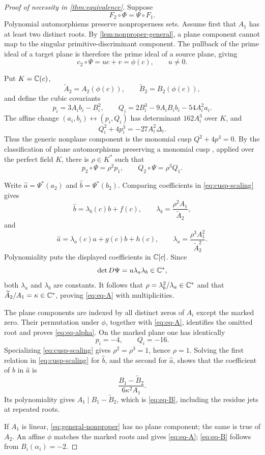 \documentclass[11pt,reqno]{amsart}
\begin{document}
\begin{proof}[Proof of necessity in \cref{thm:equivalence}]
Suppose
\[
F_2\circ\Phi=\Psi\circ F_1.
\]
Polynomial automorphisms preserve nonproperness sets.  Assume first that
\(A_1\) has at least two distinct roots.  By
\cref{lem:nonproper-general}, a plane component cannot map to the singular
primitive-discriminant component.  The pullback of the prime ideal of a
target plane is therefore the prime ideal of a source plane, giving
\begin{equation}
\label{eq:c-affine}
c_2\circ\Psi=uc+v=\phi(c),\qquad u\ne0.
\end{equation}

Put \(K=\mathbb C(c)\),
\[
\widetilde A_2=A_2(\phi(c)),\qquad
\widetilde B_2=B_2(\phi(c)),
\]
and define the cubic covariants
\[
p_i=3A_i b_i-B_i^2,\qquad
Q_i=2B_i^3-9A_iB_i b_i-54A_i^2a_i.
\]
The affine change \((a_i,b_i)\leftrightarrow(p_i,Q_i)\) has determinant
\(162A_i^3\) over \(K\), and
\begin{equation}
\label{eq:cusp-covariant}
Q_i^2+4p_i^3=-27A_i^2\Delta_i.
\end{equation}
Thus the generic nonplane component is the monomial cusp
\(Q^2+4p^3=0\).  By the classification of plane automorphisms preserving
a monomial cusp \cite[Theorem~2(ii)]{blancStampfli2015}, applied over the
perfect field \(K\), there is \(\rho\in K^*\) such that
\begin{equation}
\label{eq:cusp-scaling}
p_2\circ\Psi=\rho^2p_1,\qquad
Q_2\circ\Psi=\rho^3Q_1.
\end{equation}

Write \(\widehat a=\Psi^*(a_2)\) and
\(\widehat b=\Psi^*(b_2)\).  Comparing coefficients in
\eqref{eq:cusp-scaling} gives
\[
\widehat b=\lambda_b(c)b+f(c),\qquad
\lambda_b=\frac{\rho^2A_1}{\widetilde A_2},
\]
and
\[
\widehat a=\lambda_a(c)a+g(c)b+h(c),\qquad
\lambda_a=\frac{\rho^3A_1^2}{\widetilde A_2^2}.
\]
Polynomiality puts the displayed coefficients in \(\mathbb C[c]\).  Since
\[
\det D\Psi=u\lambda_a\lambda_b\in\mathbb C^*,
\]
both \(\lambda_a\) and \(\lambda_b\) are constants.  It follows that
\(\rho=\lambda_b^2/\lambda_a\in\mathbb C^*\) and that
\(\widetilde A_2/A_1=\kappa\in\mathbb C^*\), proving
\eqref{eq:eq-A} with multiplicities.

The plane components are indexed by all distinct zeros of \(A_i\) except
the marked zero.  Their permutation under \(\phi\), together with
\eqref{eq:eq-A}, identifies the omitted root and proves
\eqref{eq:eq-alpha}.  On the marked plane one has identically
\[
p_i=-4,\qquad Q_i=-16.
\]
Specializing \eqref{eq:cusp-scaling} gives
\(\rho^2=\rho^3=1\), hence \(\rho=1\).  Solving the first relation in
\eqref{eq:cusp-scaling} for \(\widehat b\), and the second for
\(\widehat a\), shows that the coefficient of \(b\) in
\(\widehat a\) is
\[
\frac{B_1-\widetilde B_2}{6\kappa^2A_1}.
\]
Its polynomiality gives \(A_1\mid B_1-\widetilde B_2\), which is
\eqref{eq:eq-B}, including the residue jets at repeated roots.

If \(A_1\) is linear, \eqref{eq:general-nonproper} has no plane component;
the same is true of \(A_2\).  An affine \(\phi\) matches the marked roots
and gives \eqref{eq:eq-A}; \eqref{eq:eq-B} follows from
\(B_i(\alpha_i)=-2\).
\end{proof}
\end{document}
